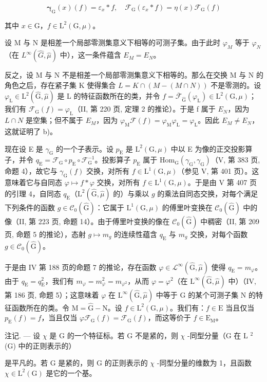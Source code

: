 \[
\boldsymbol {\gamma} _ {\mathrm{G}} (x) (f) = \varepsilon_ {x} * f, \quad \mathcal {F} _ {\mathrm{G}} (\varepsilon_ {x} * f) = \eta (x) \mathcal {F} _ {\mathrm{G}} (f)
\]

其中 \(x\in \mathrm{G}\)，\(f\in \mathrm{L}^2 (\mathrm{G},\mu)\)。

设 M 与 N 是相差一个局部零测集意义下相等的可测子集。由于此时 \(\varphi_{M}\) 等于 \(\varphi_{N}\)（在 \(L^{\infty}(\widehat{G},\widehat{\mu})\) 中），这一条件蕴含 \(E_{M}=E_{N}\)。

反之，设 M 与 N 不是相差一个局部零测集意义下相等的。那么在交换 M 与 N 的角色之后，存在紧子集 K 使得集合 \(L = K \cap (M - (M \cap N))\) 不是零测的。设 \(\varphi_{\mathrm{L}} \in \mathrm{L}^{2}(\widehat{\mathrm{G}}, \widehat{\mu})\) 是 L 的特征函数所在的类，并令 \(f = \overline{\mathcal{F}}_{\widehat{\mathrm{G}}}(\varphi_{\mathrm{L}}) \in \mathrm{L}^{2}(\mathrm{G}, \mu)\)；我们有 \(\mathcal{F}_{\mathrm{G}}(f) = \varphi_{\mathrm{L}}\)（II, 第 220 页, 定理 2 的推论）。于是 f 属于 \(E_{N}\)，因为 \(L \cap N\) 是空集；但不属于 \(E_{M}\)，因为 \(\varphi_{\mathrm{M}}\mathcal{F}(f) = \varphi_{\mathrm{M}}\varphi_{\mathrm{L}} = \varphi_{\mathrm{L}}\)。因此 \(E_{M} \neq E_{N}\)，这就证明了 b)。

现在设 E 是 \(\gamma_{\mathrm{G}}\) 的一个子表示。设 \(p_{\mathrm{E}}\) 是 \(\mathrm{L}^2 (\mathrm{G},\mu)\) 中以 E 为像的正交投影算子，并令 \(q_{\mathrm{E}} = \mathcal{F}_{\mathrm{G}}\circ p_{\mathrm{E}}\circ \mathcal{F}_{\mathrm{G}}^{-1}\)。投影算子 \(p_{\mathrm{E}}\) 属于 \(\mathrm{Hom}_{\mathrm{G}}(\gamma_{\mathrm{G}},\gamma_{\mathrm{G}})\)（V, 第 383 页, 命题 4），故它与 \(\gamma_{\mathrm{G}}(f)\) 交换，对所有 \(f\in \mathrm{L}^{1}(\mathrm{G},\mu)\)（参见 V, 第 401 页）。这意味着它与自同态 \(\varphi \mapsto f*\varphi\) 交换，对所有 \(f\in \mathrm{L}^{1}(\mathrm{G},\mu)\)。于是由 V 第 407 页的引理 4，自同态 \(q_{\mathrm{E}}\)（\(\mathrm{L}^2 (\widehat{\mathrm{G}},\widehat{\mu})\) 的）与乘以 \(g\) 的乘法自同态交换，对每个满足下列条件的函数 \(g\in \mathcal{C}_0(\widehat{\mathrm{G}})\)：它属于 \(\mathrm{L}^1 (\mathrm{G},\mu)\) 的傅里叶变换在 \(\mathcal{C}_0(\widehat{\mathrm{G}})\) 中的像（II, 第 223 页, 命题 14）。由于傅里叶变换的像在 \(\mathcal{C}_0(\widehat{\mathrm{G}})\) 中稠密（II, 第 209 页, 命题 5 的推论），态射 \(g\mapsto m_g\) 的连续性蕴含 \(q_{\mathrm{E}}\) 与 \(m_g\) 交换，对每个函数 \(g\in \mathcal{C}_0(\widehat{\mathrm{G}})\)。

于是由 IV 第 188 页的命题 7 的推论，存在函数 \(\varphi \in \mathcal{L}^{\infty}(\widehat{\mathrm{G}},\widehat{\mu})\) 使得 \(q_{\mathrm{E}} = m_{\varphi}\)。由于 \(q_{\mathrm{E}} = q_{\mathrm{E}}^{2}\)，我们有 \(m_{\varphi} = m_{\varphi}^{2} = m_{\varphi^{2}}\)，从而 \(\varphi = \varphi^{2}\)（在 \(\mathrm{L}^{\infty}(\widehat{\mathrm{G}},\widehat{\mu})\) 中）（IV, 第 186 页, 命题 5）；这意味着 \(\varphi\) 在 \(\mathrm{L}^{\infty}(\widehat{\mathrm{G}},\widehat{\mu})\) 中等于 \(\widehat{\mathrm{G}}\) 的某个可测子集 N 的特征函数所在的类。令 \(\mathrm{M} = \widehat{\mathrm{G}} - \mathrm{N}\)。设 \(f \in \mathrm{L}^{2}(\mathrm{G},\mu)\)。我们有：\(f \in \mathrm{E}\) 当且仅当 \(p_{\mathrm{E}}(f) = f\)，当且仅当 \(\varphi \mathcal{F}_{\mathrm{G}}(f) = \mathcal{F}_{\mathrm{G}}(f)\)，而这等价于 \(f \in \mathrm{E}_{\mathrm{M}}\)。

注记. --- 设 \(\chi\) 是 G 的一个特征标。若 G 不是紧的，则 \(\chi\) -同型分量（G 在 L \(^{2}\) (G) 中的正则表示的）

是平凡的。若 G 是紧的，则 G 的正则表示的 \(\chi\) -同型分量的维数为 1，且函数 \(\chi \in \mathrm{L}^{2}(\mathrm{G})\) 是它的一个基。

